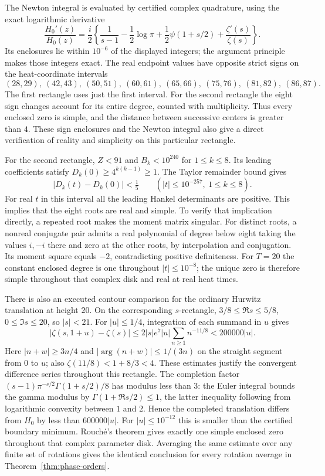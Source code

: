 The Newton integral is evaluated by certified complex quadrature,
using the exact logarithmic derivative
\[
 \frac{H_0'(z)}{H_0(z)}=\frac i2\left\{
 \frac1{s-1}-\frac12\log\pi
 +\frac12\psi(1+s/2)+\frac{\zeta'(s)}{\zeta(s)}\right\}.
\]
Its enclosures lie within $10^{-6}$ of the displayed integers;
the argument principle makes those integers exact. The real
endpoint values have opposite strict signs on the heat-coordinate
intervals
\[
 (28,29),\ (42,43),\ (50,51),\ (60,61),\
 (65,66),\ (75,76),\ (81,82),\ (86,87).
\]
The first rectangle uses just the first interval. For the second
rectangle the eight sign changes account for its entire degree,
counted with multiplicity. Thus every enclosed zero is simple, and
the distance between successive centers is greater than $4$.
These sign enclosures and the Newton integral also give a direct
verification of reality and simplicity on this particular rectangle.

For the second rectangle, $Z<91$ and $B_k<10^{240}$ for
$1\le k\le8$. Its leading coefficients satisfy
$D_k(0)\ge4^{k(k-1)}\ge1$. The Taylor remainder bound gives
\[
 |D_k(t)-D_k(0)|<\tfrac15
       \qquad (|t|\le10^{-257},\ 1\le k\le8).
\]
For real $t$ in this interval all the leading Hankel determinants
are positive. This implies that the eight roots are real and simple.
To verify that implication directly, a repeated root makes the
moment matrix singular. For distinct roots, a nonreal conjugate
pair admits a real polynomial of degree below eight taking the
values $i,-i$ there and zero at the other roots, by interpolation
and conjugation. Its moment square equals $-2$, contradicting
positive definiteness. For $T=20$ the constant enclosed degree is
one throughout $|t|\le10^{-8}$; the unique zero is therefore simple
throughout that complex disk and real at real heat times.

There is also an executed contour comparison for the ordinary
Hurwitz translation at height $20$. On the corresponding
$s$-rectangle, $3/8\le\Re s\le5/8$, $0\le\Im s\le20$,
so $|s|<21$. For $|u|\le1/4$, integration of each summand in $u$
gives
\[
 |\zeta(s,1+u)-\zeta(s)|
 \le 2|s|e^7|u|\sum_{n\ge1}n^{-11/8}
 <200000|u|.
\]
Here $|n+w|\ge3n/4$ and $|\arg(n+w)|\le1/(3n)$ on
the straight segment from $0$ to $u$; also
$\zeta(11/8)<1+8/3<4$. These estimates justify the convergent
difference series throughout this rectangle. The completion factor
$(s-1)\pi^{-s/2}\Gamma(1+s/2)/8$ has modulus less than $3$:
the Euler integral bounds the gamma modulus by
$\Gamma(1+\Re s/2)\le1$, the latter inequality following from
logarithmic convexity between $1$ and $2$. Hence the completed
translation differs from $H_0$ by less than $600000|u|$.
For $|u|\le10^{-12}$ this is smaller than the certified boundary
minimum. Rouch\'e's theorem gives exactly one simple enclosed zero
throughout that complex parameter disk. Averaging the same estimate
over any finite set of rotations gives the identical conclusion
for every rotation average in Theorem~\ref{thm:phase-orders}.


